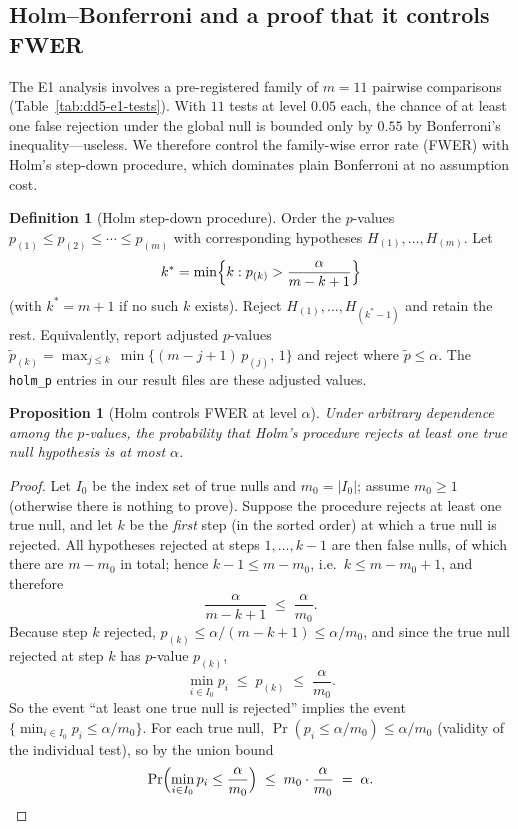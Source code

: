 \documentclass[11pt,a4paper]{article}
\theoremstyle{definition}
\newtheorem{definition}{Definition}[section]
\theoremstyle{plain}
\newtheorem{proposition}{Proposition}[section]
\begin{document}
\subsection{Holm--Bonferroni and a proof that it controls FWER}
\label{sec:dd5-holm}

The E1 analysis involves a pre-registered family of $m = 11$ pairwise
comparisons (Table~\ref{tab:dd5-e1-tests}). With $11$ tests at level $0.05$
each, the chance of at least one false rejection under the global null is
bounded only by $0.55$ by Bonferroni's inequality---useless. We therefore
control the family-wise error rate (FWER) with Holm's step-down procedure,
which dominates plain Bonferroni at no assumption cost.

\begin{definition}[Holm step-down procedure]
\label{def:dd5-holm}
Order the $p$-values $p_{(1)} \le p_{(2)} \le \cdots \le p_{(m)}$ with
corresponding hypotheses $H_{(1)},\dots,H_{(m)}$. Let
\[
k^\ast = \min\Bigl\{ k : p_{(k)} > \frac{\alpha}{m - k + 1} \Bigr\}
\]
(with $k^\ast = m+1$ if no such $k$ exists). Reject
$H_{(1)},\dots,H_{(k^\ast - 1)}$ and retain the rest. Equivalently, report
adjusted $p$-values
$\tilde{p}_{(k)} = \max_{j \le k}\, \min\{(m-j+1)\, p_{(j)},\, 1\}$
and reject where $\tilde{p} \le \alpha$. The \texttt{holm\_p} entries in our
result files are these adjusted values.
\end{definition}

\begin{proposition}[Holm controls FWER at level $\alpha$]
\label{prop:dd5-holm-fwer}
Under arbitrary dependence among the $p$-values, the probability that Holm's
procedure rejects at least one true null hypothesis is at most $\alpha$.
\end{proposition}

\begin{proof}
Let $I_0$ be the index set of true nulls and $m_0 = |I_0|$; assume $m_0 \ge 1$
(otherwise there is nothing to prove). Suppose the procedure rejects at least
one true null, and let $k$ be the \emph{first} step (in the sorted order) at
which a true null is rejected. All hypotheses rejected at steps
$1,\dots,k-1$ are then false nulls, of which there are $m - m_0$ in total;
hence $k - 1 \le m - m_0$, i.e.\ $k \le m - m_0 + 1$, and therefore
\[
\frac{\alpha}{m - k + 1} \;\le\; \frac{\alpha}{m_0}.
\]
Because step $k$ rejected, $p_{(k)} \le \alpha/(m-k+1) \le \alpha/m_0$, and
since the true null rejected at step $k$ has $p$-value $p_{(k)}$,
\[
\min_{i \in I_0} p_i \;\le\; p_{(k)} \;\le\; \frac{\alpha}{m_0}.
\]
So the event ``at least one true null is rejected'' implies the event
$\{\min_{i \in I_0} p_i \le \alpha/m_0\}$. For each true null,
$\Pr(p_i \le \alpha/m_0) \le \alpha/m_0$ (validity of the individual test),
so by the union bound
\[
\Pr\Bigl(\min_{i \in I_0} p_i \le \frac{\alpha}{m_0}\Bigr)
\;\le\; m_0 \cdot \frac{\alpha}{m_0} \;=\; \alpha. \qedhere
\]
\end{proof}
\end{document}
